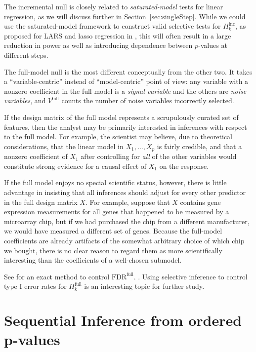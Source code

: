 \documentclass{article}
\begin{document}
The incremental null is closely related to {\em saturated-model} tests for linear regression, as we will discuss further in Section~\ref{sec:singleStep}. While we could use the saturated-model framework to construct valid selective tests for $H_k^{\text{inc}}$, as proposed for LARS and lasso regression in \citet{taylor2014exact}, this will often result in a large reduction in power as well as introducing dependence between $p$-values at different steps. 

The full-model null is the most different conceptually from the other two. It takes a ``variable-centric'' instead of ``model-centric'' point of view: any variable with a nonzero coefficient in the full model is a {\em signal variable} and the others are {\em noise variables}, and $V^{\text{full}}$ counts the number of noise variables incorrectly selected. 

If the design matrix of the full model represents a scrupulously curated set of features, then the analyst may be primarily interested in inferences with respect to the full model. For example, the scientist may believe, due to theoretical considerations, that the linear model in $X_1, \ldots, X_p$ is fairly credible, and that a nonzero coefficient of $X_1$ after controlling for {\em all} of the other variables would constitute strong evidence for a causal effect of $X_1$ on the response. 

If the full model enjoys no special scientific status, however, there is little advantage in insisting that all inferences should adjust for every other predictor in the full design matrix $X$. For example, suppose that $X$ contains gene expression measurements for all genes that happened to be measured by a microarray chip, but if we had purchased the chip from a different manufacturer, we would have measured a different set of genes. Because the full-model coefficients are already artifacts of the somewhat arbitrary choice of which chip we bought, there is no clear reason to regard them as more scientifically interesting than the coefficients of a well-chosen submodel.

See \citet{barber2014controlling} for an exact method to control $\text{FDR}^{\text{full}}$. . Using selective inference to control type I error rates for $H_k^{\text{full}}$ is an interesting topic for further study.

\section{Sequential Inference from ordered p-values}
\label{sec:sequential}
\end{document}
